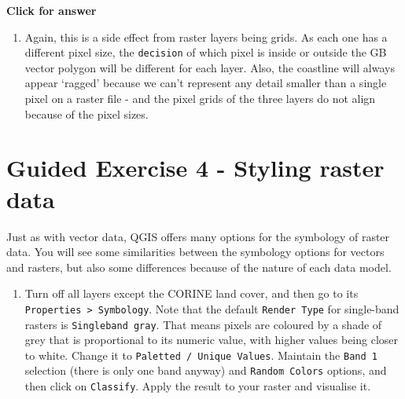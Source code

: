 \documentclass[
  letterpaper,
  DIV=11,
  numbers=noendperiod]{scrreprt}
\providecommand{\tightlist}{%
  \setlength{\itemsep}{0pt}\setlength{\parskip}{0pt}}\usepackage{longtable,booktabs,array}
\begin{document}
\begin{tcolorbox}[enhanced jigsaw, toprule=.15mm, breakable, left=2mm, colframe=quarto-callout-important-color-frame, colback=white, arc=.35mm, leftrule=.75mm, opacityback=0, rightrule=.15mm, bottomrule=.15mm]

\vspace{-3mm}\textbf{Click for answer}\vspace{3mm}

\begin{enumerate}
\def\labelenumi{\alph{enumi})}
\tightlist
\item
  Again, this is a side effect from raster layers being grids. As each
  one has a different pixel size, the \texttt{decision} of which pixel
  is inside or outside the GB vector polygon will be different for each
  layer. Also, the coastline will always appear `ragged' because we
  can't represent any detail smaller than a single pixel on a raster
  file - and the pixel grids of the three layers do not align because of
  the pixel sizes.
\end{enumerate}

\end{tcolorbox}

\section{Guided Exercise 4 - Styling raster
data}\label{guided-exercise-4---styling-raster-data}

Just as with vector data, QGIS offers many options for the symbology of
raster data. You will see some similarities between the symbology
options for vectors and rasters, but also some differences because of
the nature of each data model.

\begin{enumerate}
\def\labelenumi{(\arabic{enumi})}
\setcounter{enumi}{135}
\tightlist
\item
  Turn off all layers except the CORINE land cover, and then go to its
  \texttt{Properties\ \textgreater{}\ Symbology}. Note that the default
  \texttt{Render\ Type} for single-band rasters is
  \texttt{Singleband\ gray}. That means pixels are coloured by a shade
  of grey that is proportional to its numeric value, with higher values
  being closer to white. Change it to
  \texttt{Paletted\ /\ Unique\ Values}. Maintain the \texttt{Band\ 1}
  selection (there is only one band anyway) and \texttt{Random\ Colors}
  options, and then click on \texttt{Classify}. Apply the result to your
  raster and visualise it.
\end{enumerate}
\end{document}
